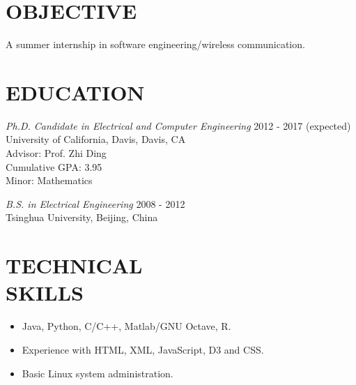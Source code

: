 \documentclass[margin]{res} %
\begin{document}
    \begin{resume}

     
        \section{OBJECTIVE}  
        A summer internship in software engineering/wireless communication.
    
    
        \section{EDUCATION}
    
        {\sl Ph.D. Candidate in Electrical and Computer Engineering} \hfill 2012 -
        2017 (expected) \\
        University of California, Davis, Davis, CA \\
        Advisor: Prof. Zhi Ding \\
        Cumulative GPA: 3.95 \\
        Minor: Mathematics 
        
        {\sl B.S. in Electrical Engineering}  \hfill 2008 - 2012\\
        Tsinghua University, Beijing, China
       
    
        \section{TECHNICAL \\ SKILLS}
        
        \begin{itemize}
            \item Java, Python, C/C++, Matlab/GNU Octave, R.
            \item Experience with HTML, XML, JavaScript, D3 and CSS.
            \item Basic Linux system administration.
        \end{itemize} 
    

\end{resume}
\end{document}

